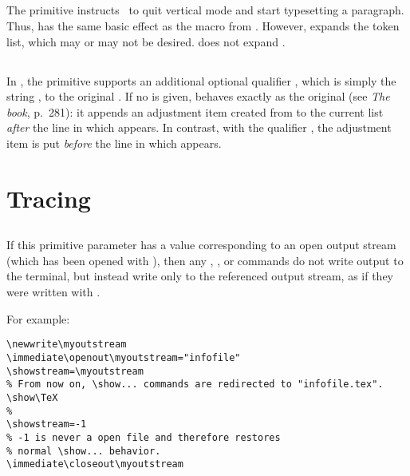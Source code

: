 \documentclass{pdftexmanual}
\begin{document}
\subsection{}

The primitive instructs \PDFTEX\ to quit vertical mode and start
typesetting a paragraph. Thus,  has the same basic effect
as the  macro from . However,
 expands the  token list, which may or may
not be desired.  does not expand .

\subsection{}

In \PDFTEX, the  primitive supports an additional optional
qualifier , which is simply the string ,
to the original \TEX. If no  is given,  behaves
exactly as the original (see {\em The \TEX book}, p.~281): it appends an
adjustment item created from  to the
current list {\em after} the line in which  appears. In
contrast, with the qualifier , the adjustment item is put {\em
before} the line in which  appears.

\section{Tracing}

\subsection{}

If this primitive parameter has a value corresponding to an open output
stream (which has been opened with ), then any ,
,  or  commands do not write
output to the terminal, but instead write only to the referenced output
stream, as if they were written with .

For example:
\begin{verbatim}
\newwrite\myoutstream
\immediate\openout\myoutstream="infofile"
\showstream=\myoutstream
% From now on, \show... commands are redirected to "infofile.tex".
\show\TeX
%
\showstream=-1
% -1 is never a open file and therefore restores
% normal \show... behavior.
\immediate\closeout\myoutstream
\end{verbatim}
\end{document}
